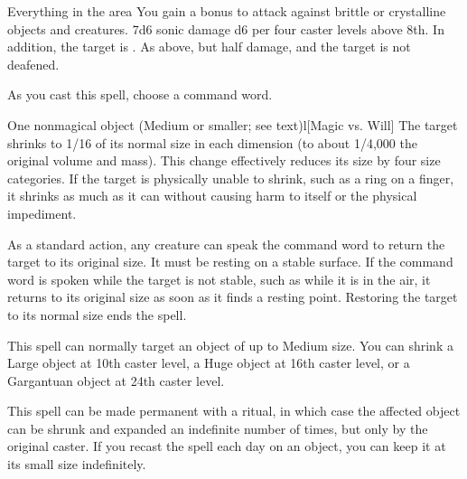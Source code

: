 \begin{spellheader}
\end{spellheader}
\begin{spelleffects}
    \begin{spelltargets}{Everything in the area}
        \spellspecial You gain a  bonus to attack against brittle or crystalline objects and creatures.
        \spellsuccess 7d6 sonic damage \add d6 per four caster levels above 8th. In addition, the target is \deafened.
        \spellfailure As above, but half damage, and the target is not deafened.
    \end{spelltargets}
\end{spelleffects}

\begin{spellheader}
    \spellrng{\rngclose}
    \spellspecial As you cast this spell, choose a command word.
\end{spellheader}
\begin{spelleffects}
    \begin{spelltarget}{One nonmagical object (Medium or smaller; see text)}l[Magic vs. Will]
        \spellsuccess The target shrinks to 1/16 of its normal size in each dimension (to about 1/4,000 the original volume and mass). This change effectively reduces its size by four size categories. If the target is physically unable to shrink, such as a ring on a finger, it shrinks as much as it can without causing harm to itself or the physical impediment.

        As a standard action, any creature can speak the command word to return the target to its original size. It must be resting on a stable surface. If the command word is spoken while the target is not stable, such as while it is in the air, it returns to its original size as soon as it finds a resting point. Restoring the target to its normal size ends the spell.
    \end{spelltarget}
\end{spelleffects}
\begin{spellfooter}
    \spellnotes This spell can normally target an object of up to Medium size. You can shrink a Large object at 10th caster level, a Huge object at 16th caster level, or a Gargantuan object at 24th caster level.
    \par This spell can be made permanent with a  ritual, in which case the affected object can be shrunk and expanded an indefinite number of times, but only by the original caster. If you recast the spell each day on an object, you can keep it at its small size indefinitely.
\end{spellfooter}

